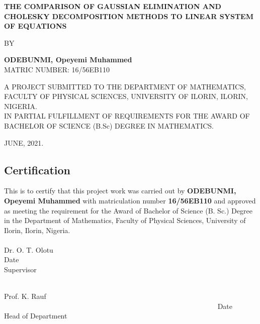 \tableofcontents
{}
\begin{titlepage}
\setlength\parindent{0pt}
\begin{center}
	\textbf{\large THE COMPARISON OF GAUSSIAN ELIMINATION AND CHOLESKY DECOMPOSITION METHODS TO LINEAR SYSTEM OF EQUATIONS}
\end{center}
\vspace{0.6in}
\begin{center}
	BY
\end{center}
\vspace{0.6in}
\begin{center}
	\textbf{ODEBUNMI, Opeyemi Muhammed}
	\\[35pt]
	
	 MATRIC NUMBER: 16/56EB110
\end{center}
\vspace{2cm}
A PROJECT SUBMITTED TO THE DEPARTMENT OF MATHEMATICS, FACULTY OF PHYSICAL SCIENCES, UNIVERSITY OF ILORIN, ILORIN, NIGERIA.\\
 IN PARTIAL FULFILLMENT OF  REQUIREMENTS FOR THE AWARD OF BACHELOR OF SCIENCE (B.Sc) DEGREE IN MATHEMATICS.
\\[35pt]
\begin{center}
JUNE, 2021.
\end{center}
\end{titlepage}

\newpage
\begin{center}\section*{Certification}\end{center}
This is to certify that this project work was carried out by \textbf{ODEBUNMI, Opeyemi Muhammed} with matriculation number \textbf{16/56EB110} and approved as meeting the requirement for the Award of Bachelor of Science (B. Sc.) Degree in the Department of Mathematics, Faculty of Physical Sciences, University of Ilorin, Ilorin, Nigeria.\\

\vspace{.99in}
\noindent
\dotfill			\hfill			\dotfill\\
{Dr. O. T. Olotu} ~~~~~~~~~~~~~~~~~~~~~~~~~~~~~~~~~~~~~~~~~~~~~~~~~~~~~~~~~  Date\\
Supervisor

\vspace{.99in}
\noindent
\dotfill			\hfill			\dotfill\\
{Prof. K. Rauf} ~~~~~~~~~~~~~~~~~~~~~~~~~~~~~~~~~~~~~~~~~~~~~~~~~~~~~~~~~~~~ Date\\
Head of Department


